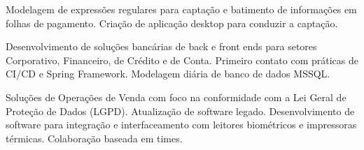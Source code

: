 \documentclass[10pt,a4paper,ragged2e]{altacv}
\begin{document}

\begin{fullwidth}
\makecvheader
\end{fullwidth}

Modelagem de expressões regulares para captação e batimento de informações em folhas de pagamento. Criação de aplicação desktop para conduzir a captação.
\\


\divider

Desenvolvimento de soluções bancárias de back e front ends para setores Corporativo, Financeiro, de Crédito e de Conta. Primeiro contato com práticas de CI/CD e Spring Framework. Modelagem diária de banco de dados MSSQL.
\\


\divider

Soluções de Operações de Venda com foco na conformidade com a Lei Geral de Proteção de Dados (LGPD). Atualização de software legado. Desenvolvimento de software para integração e interfaceamento com leitores biométricos e impressoras térmicas. Colaboração baseada em times.
\\

\\
\end{document}
